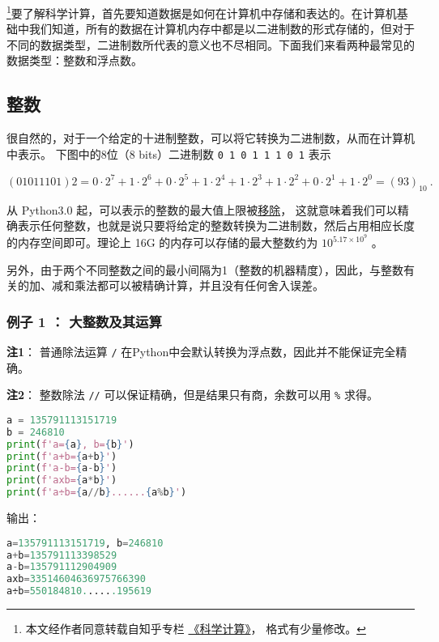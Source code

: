 

\footnote{本文经作者同意转载自知乎专栏 \href{https://www.zhihu.com/column/c_1226443594048942080}{《科学计算》}， 格式有少量修改。}要了解科学计算，首先要知道数据是如何在计算机中存储和表达的。在计算机基础中我们知道，所有的数据在计算机内存中都是以二进制数的形式存储的，但对于不同的数据类型，二进制数所代表的意义也不尽相同。下面我们来看两种最常见的数据类型：整数和浮点数。

\subsection{整数}

很自然的，对于一个给定的十进制整数，可以将它转换为二进制数，从而在计算机中表示。 下图中的8位（8 bits）二进制数 \verb|0 1 0 1 1 1 0 1| 表示

\begin{equation}
(01011101)2=0\cdot2^7+1\cdot2^6+0\cdot2^5+1\cdot2^4+1\cdot2^3+1\cdot2^2+0\cdot2^1+1\cdot2^0=(93)_{10}~.
\end{equation}

从 Python3.0 起，可以表示的整数的最大值上限被\href{https://docs.python.org/3.1/whatsnew/3.0.html#integers}{移除}， 这就意味着我们可以精确表示任何整数，也就是说只要将给定的整数转换为二进制数，然后占用相应长度的内存空间即可。理论上 16G 的内存可以存储的最大整数约为  $10^{5.17\times10^9}$  。

另外，由于两个不同整数之间的最小间隔为1（整数的机器精度），因此，与整数有关的加、减和乘法都可以被精确计算，并且没有任何舍入误差。

\subsubsection{例子 1 ： 大整数及其运算}

\textbf{注1}： 普通除法运算  \verb|/|  在Python中会默认转换为浮点数，因此并不能保证完全精确。

\textbf{注2}： 整数除法 \verb|//| 可以保证精确，但是结果只有商，余数可以用 \verb|%|  求得。

\begin{lstlisting}[language=python]
a = 135791113151719
b = 246810
print(f'a={a}, b={b}')
print(f'a+b={a+b}')
print(f'a-b={a-b}')
print(f'axb={a*b}')
print(f'a÷b={a//b}......{a%b}')
\end{lstlisting}
输出：
\begin{lstlisting}[language=python]
a=135791113151719, b=246810 
a+b=135791113398529 
a-b=135791112904909 
axb=33514604636975766390 
a÷b=550184810......195619
\end{lstlisting}


